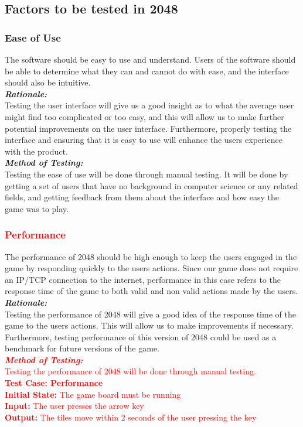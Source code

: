 \documentclass[12pt]{article}
\begin{document}
\subsection{Factors to be tested in 2048}
\subsubsection{Ease of Use}
The software should be easy to use and understand. Users of the software should be able to determine what they can and cannot do with ease, and the interface should also be intuitive.\\

\textbf{\emph{Rationale:}}\\
Testing the user interface will give us a good insight as to what the average user might find too complicated or too easy, and this will allow us to make further potential improvements on the user interface. Furthermore, properly testing the interface and ensuring that it is easy to use will enhance the users experience with the product. \\

\textbf{\emph{Method of Testing:}}\\
Testing the ease of use will be done through manual testing. It will be done by getting a set of users that have no background in computer science or any related fields, and getting feedback from them about the interface and how easy the game was to play.

\subsubsection{\textcolor{red}{Performance}}
The performance of 2048 should be high enough to keep the users engaged in the game by responding quickly to the users actions. Since our game does not require an IP/TCP connection to the internet, performance in this case refers to the response time of the game to both valid and non valid actions made by the users. \\

\textbf{\emph{Rationale:}}\\
Testing the performance of 2048 will give a good idea of the response time of the game to the users actions. This will allow us to make improvements if necessary. Furthermore, testing performance of this version of 2048 could be used as a benchmark for future versions of the game. \\

\textcolor{red}{\textbf{\emph{Method of Testing:}}\\
Testing the performance of 2048 will be done through manual testing.\\
\textbf{Test Case: Performance}\\
\textbf{Initial State:} The game board must be running\\
\textbf{Input:} The user presses the arrow key\\
\textbf{Output:} The tiles move within 2 seconds of the user pressing the key\\}
\end{document}
